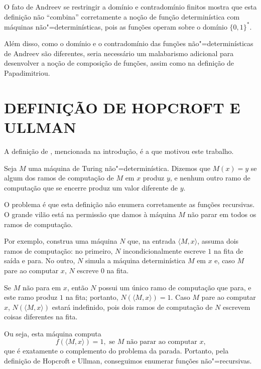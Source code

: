 O fato de Andreev se restringir a domínio e contradomínio finitos
mostra que esta definição não ``combina'' corretamente
a noção de função determinística com máquinas não"=determinísticas,
pois as funções operam sobre o domínio $\{0, 1\}^*$.

Além disso,
como o domínio e o contradomínio das funções não"=determinísticas de Andreev
são diferentes,
seria necessário um malabarismo adicional
para desenvolver a noção de composição de funções,
assim como na definição de Papadimitriou.

\section{DEFINIÇÃO DE HOPCROFT E ULLMAN}

A definição de ,
mencionada na introdução,
é a que motivou este trabalho.
\begin{definition}
    Seja $M$ uma máquina de Turing não"=determinística.
    Dizemos que $M(x) = y$ se
    algum dos ramos de computação de $M$ em $x$ produz $y$,
    e nenhum outro ramo de computação que se encerre
    produz um valor diferente de $y$.
    \cite[p.~313]{HopcroftUllman1979}
\end{definition}

O problema é que esta definição não enumera corretamente as funções recursivas.
O grande vilão está na permissão que damos à máquina $M$
não parar em todos os ramos de computação.

Por exemplo,
construa uma máquina $N$ que,
na entrada $\langle M, x \rangle$,
assuma dois ramos de computação:
no primeiro,
$N$ incondicionalmente escreve $1$ na fita de saída e para.
No outro, $N$ simula a máquina determinística $M$ em $x$ e,
caso $M$ pare ao computar $x$,
$N$ escreve $0$ na fita.

Se $M$ não para em $x$,
então $N$ possui um único ramo de computação que para,
e este ramo produz $1$ na fita;
portanto, $N(\langle M, x \rangle) = 1$.
Caso $M$ pare ao computar $x$,
$N(\langle M, x \rangle)$ estará indefinido,
pois dois ramos de computação de $N$ escrevem coisas diferentes na fita.

Ou seja,
esta máquina computa
\begin{equation*}
    f(\langle M, x \rangle) = 1, \text{ se $M$ não parar ao computar $x$,}
\end{equation*}
que é exatamente o complemento do problema da parada.
Portanto,
pela definição de Hopcroft e Ullman,
conseguimos enumerar funções não"=recursivas.


